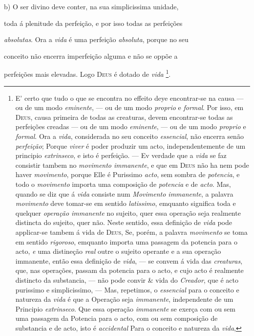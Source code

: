  b) O ser divino deve conter, na sua simplicissima unidade,

toda á plenitude da perfeição, e por isso todas as perfeições

\emph{absolutas}. Ora a \emph{vida} é uma perfeição \emph{absoluta}, porque no seu

conceito não encerra imperfeição alguma e não se oppõe a

perfeições mais elevadas. Logo \textsc{Deus} é dotado de \emph{vida} \footnote{E' certo que tudo o que se encontra no effeito deye encontrar-se na causa --- ou de um modo \emph{eminente}, --- ou de um modo \emph{proprio} e \emph{formal}. Por isso, em \textsc{Deus}, causa primeira de todas as creaturas, devem encontrar-se todas as perfeições creadas --- ou de um modo \emph{eminente}, --- ou de um modo \emph{proprio} e \emph{formal}. Ora a \emph{vida}, considerada no seu conceito \emph{essencial}, não encerra senão \emph{perfeição}; Porque \emph{viver} é poder produzir um acto, independentemente de um principio \emph{extrinseco}, e isto é perfeição. --- Ev verdade que a \emph{vida} se faz consistir tambem no \emph{movimento immanente}, e que em \textsc{Deus} não ha nem pode haver \emph{movimento}, porque Elle é Purissimo \emph{acto}, sem sombra de \emph{potencia}, e todo o \emph{movimento} importa uma composição de \emph{potencia} e de \emph{acto}. Mas, quando se diz que á \emph{vida} consiste num \emph{Movimento immanente}, a palavra \emph{movimento} deve tomar-se em sentido \emph{latissimo}, emquanto significa toda e quelquer \emph{operação immanente} no sujeito, quer essa operação seja realmente distincta do sujeito, quer não. Neste sentido, essa definição de \emph{vida} pode applicar-se tambem á vida de \textsc{Deus}, Se, porém, a palavra \emph{movimento} se toma em sentido \emph{rigoroso}, emquanto importa uma passagem da potencia para o acto, \emph{e} uma distineção \emph{real} outre o sujeito operante e a sua operação immanente, então essa definição de \emph{vida}, --- se convem á vida das \emph{creaturas}, que, nas operações, passam da potencia para o acto, e cujo acto é realmente distincto da substancia, --- não pode convir \& vida do \emph{Creador}, que é acto purissimo e simplicissimo, --- Mas, repetimos, o \emph{essencial} para o conceito e natureza da \emph{vida} é que a Operação seja \emph{immanente}, independente de um Principio \emph{extrinseco}. Que essa operação \emph{immanente} se exerça com ou sem uma passagem da Potencia para o acto, com ou sem composição de substancia e de acto, isto é \emph{accidental} Para o conceito e natureza da \emph{vida},}.

